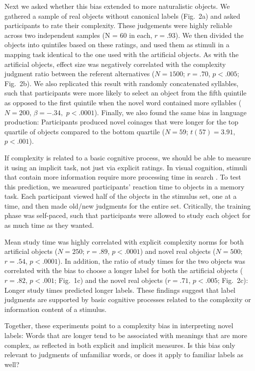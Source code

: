 \documentclass[12pt]{article}
\begin{document}
Next we asked whether this bias extended to more naturalistic objects. We gathered a sample of real objects without canonical labels (Fig.\ 2a) and asked participants to rate their complexity. These judgements were highly reliable across two independent samples (N = 60 in each, $r = .93$). We then divided the objects into quintiles based on these ratings, and used them as stimuli in a mapping task identical to the one used with the artificial objects. As with the artificial objects, effect size was negatively correlated with the complexity judgment ratio between the referent alternatives ($N = 1500$; $r = .70$, $p < .005$; Fig.\ 2b). We also replicated this result with randomly concatenated syllables, such that participants were more likely to select an object from the fifth quintile as opposed to the first quintile when the novel word contained more syllables ($N=200$, $\beta=-.34,$ $p <.0001$). Finally, we  also found the same bias in language production: Participants produced novel coinages that were longer for the top quartile of objects compared to the bottom quartile ($N=59$; $t(57) = 3.91$, $p < .001$). 
					
If complexity is related to a basic cognitive process, we should be able to measure it using an implicit task, not just via explicit ratings. In visual cognition, stimuli that contain more information require more processing time in search \cite{alvarez2004capacity, hyman}. To test this prediction, we measured participants' reaction time to objects in a memory task. Each participant viewed half of the objects in the stimulus set, one at a time, and then made old/new judgments for the entire set. Critically, the training phase was self-paced, such that participants were allowed to study each object for as much time as they wanted. 
					
Mean study time was highly correlated with explicit complexity norms for both artificial objects ($N = 250$; $r = .89$, $p < .0001$) and novel real objects ($N = 500$; $r = .54$, $p < .0001$). In addition, the ratio of study times for the two objects was correlated with the bias to choose a longer label for both the artificial objects ($r = .82$, $p < .001$; Fig.\ 1c) and the novel real objects ($r = .71$, $p < .005$; Fig.\ 2c): Longer study times predicted longer labels. These findings suggest that label judgments are supported by basic cognitive processes related to the complexity or information content of a stimulus. 
					
Together, these experiments point to a complexity bias in interpreting novel labels: Words that are longer tend to be associated with meanings that are more complex, as reflected in both explicit and implicit measures. Is this bias only relevant to judgments of unfamiliar words, or does it apply to familiar labels as well? 
\end{document}
